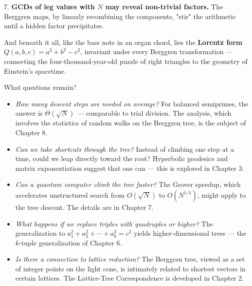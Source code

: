 \documentclass[11pt,openright,twoside]{book}
\theoremstyle{definition}
\begin{document}
7. \textbf{GCDs of leg values with $N$ may reveal non-trivial factors.} The Berggren maps, by linearly recombining the components, "stir" the arithmetic until a hidden factor precipitates.

And beneath it all, like the bass note in an organ chord, lies the \textbf{Lorentz form} $Q(a,b,c) = a^2 + b^2 - c^2$, invariant under every Berggren transformation --- connecting the four-thousand-year-old puzzle of right triangles to the geometry of Einstein's spacetime.

What questions remain?

\begin{itemize}[leftmargin=*]
\item \textit{How many descent steps are needed on average?} For balanced semiprimes, the answer is $\Theta(\sqrt{N})$ --- comparable to trial division. The analysis, which involves the statistics of random walks on the Berggren tree, is the subject of Chapter 8.
\end{itemize}

\begin{itemize}[leftmargin=*]
\item \textit{Can we take shortcuts through the tree?} Instead of climbing one step at a time, could we leap directly toward the root? Hyperbolic geodesics and matrix exponentiation suggest that one can --- this is explored in Chapter 3.
\end{itemize}

\begin{itemize}[leftmargin=*]
\item \textit{Can a quantum computer climb the tree faster?} The Grover speedup, which accelerates unstructured search from $O(\sqrt{N})$ to $O(N^{1/4})$, might apply to the tree descent. The details are in Chapter 7.
\end{itemize}

\begin{itemize}[leftmargin=*]
\item \textit{What happens if we replace triples with quadruples or higher?} The generalization to $a_1^2 + a_2^2 + \cdots + a_k^2 = c^2$ yields higher-dimensional trees --- the $k$-tuple generalization of Chapter 6.
\end{itemize}

\begin{itemize}[leftmargin=*]
\item \textit{Is there a connection to lattice reduction?} The Berggren tree, viewed as a set of integer points on the light cone, is intimately related to shortest vectors in certain lattices. The Lattice-Tree Correspondence is developed in Chapter 2.
\end{itemize}
\end{document}
